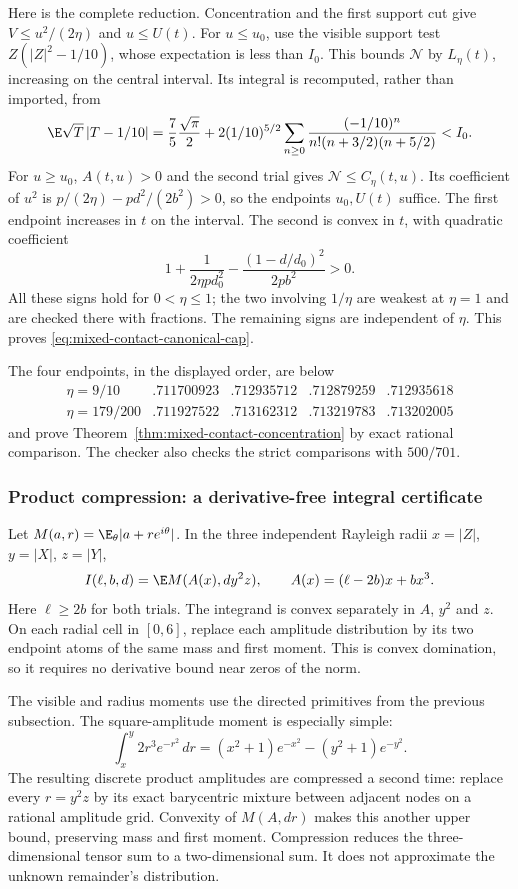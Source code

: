 Here is the complete reduction. Concentration and the first support cut
give $V\le u^2/(2\eta)$ and $u\le U(t)$.
For $u\le u_0$, use the visible support test
$Z(|Z|^2-1/10)$, whose expectation is less than $I_0$.
This bounds $\mathcal N$ by $L_\eta(t)$, increasing on the central interval.
Its integral is recomputed, rather than imported, from
\[
 \E\sqrt T\,|T-1/10|
 =\frac75\frac{\sqrt\pi}{2}
   +2(1/10)^{5/2}\sum_{n\ge0}
       \frac{(-1/10)^n}{n!(n+3/2)(n+5/2)}<I_0.
\]
For $u\ge u_0$, $A(t,u)>0$ and the second trial gives
$\mathcal N\le C_\eta(t,u)$.
Its coefficient of $u^2$ is
$p/(2\eta)-pd^2/(2b^2)>0$, so the endpoints $u_0,U(t)$ suffice.
The first endpoint increases in $t$ on the interval. The second is
convex in $t$, with quadratic coefficient
\[
 1+\frac1{2\eta p d_0^2}
     -\frac{(1-d/d_0)^2}{2pb^2}>0.
\]
All these signs hold for $0<\eta\le1$; the two involving $1/\eta$
are weakest at $\eta=1$ and are checked there with fractions.
The remaining signs are independent of $\eta$.
This proves \eqref{eq:mixed-contact-canonical-cap}.

The four endpoints, in the displayed order, are below
\[
\begin{array}{c|rrrr}
 \eta=9/10&.711700923&.712935712&.712879259&.712935618\\
 \eta=179/200&.711927522&.713162312&.713219783&.713202005
\end{array}
\]
and prove Theorem~\ref{thm:mixed-contact-concentration} by exact rational
comparison. The checker also checks the strict comparisons with $500/701$.

\subsubsection{Product compression: a derivative-free integral certificate}
Let $M(a,r)=\E_\theta|a+re^{i\theta}|$.
In the three independent Rayleigh radii $x=|Z|$, $y=|X|$, $z=|Y|$,
\[
 I(\ell,b,d)=\E M(A(x),d y^2z),\qquad
 A(x)=(\ell-2b)x+bx^3.
\]
Here $\ell\ge2b$ for both trials. The integrand is convex separately
in $A$, $y^2$ and $z$. On each radial cell in $[0,6]$, replace each
amplitude distribution by its two endpoint atoms of the same mass and
first moment. This is convex domination, so it requires no derivative
bound near zeros of the norm.

The visible and radius moments use the directed primitives from the
previous subsection. The square-amplitude moment is especially simple:
\[
 \int_x^y2r^3e^{-r^2}\,dr
       =(x^2+1)e^{-x^2}-(y^2+1)e^{-y^2}.
\]
The resulting discrete product amplitudes are compressed a second time:
replace every $r=y^2z$ by its exact barycentric mixture between adjacent
nodes on a rational amplitude grid. Convexity of $M(A,dr)$ makes this
another upper bound, preserving mass and first moment. Compression
reduces the three-dimensional tensor sum to a two-dimensional sum.
It does not approximate the unknown remainder's distribution.

